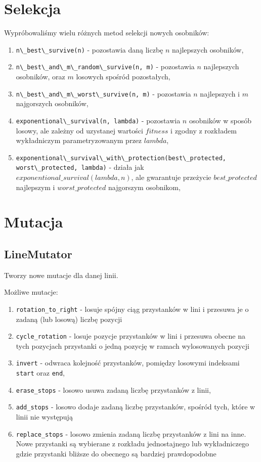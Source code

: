 \documentclass[12pt,a4paper,openright]{mwrep}
\begin{document}
\section{Selekcja}
Wypróbowaliśmy wielu różnych metod selekcji nowych osobników:
\begin{enumerate}
    \item \lstinline{n\_best\_survive(n)} - pozostawia daną liczbę $n$ najlepszych osobników,
    \item \lstinline{n\_best\_and\_m\_random\_survive(n, m)} - pozostawia $n$ najlepszych osobników, oraz $m$ losowych spośród pozostałych,
    \item \lstinline{n\_best\_and\_m\_worst\_survive(n, m)} - pozostawia $n$ najlepszych i $m$ najgorszych osobników,
    \item \lstinline{exponentional\_survival(n, lambda)} - pozostawia $n$ osobników w sposób losowy, ale zależny od uzystanej wartości $fitness$ i zgodny z rozkładem wykładniczym parametryzowanym przez $lambda$,
    \item \lstinline{exponentional\_survival\_with\_protection(best\_protected, worst\_protected, lambda)} - działa jak $exponentional\_survival(lambda, n)$, ale gwarantuje przeżycie $best\_protected$ najlepszym i $worst\_protected$ najgorszym osobnikom,
\end{enumerate}

\section{Mutacja}

\subsection{LineMutator}
Tworzy nowe mutacje dla danej linii.

Możliwe mutacje:

\begin{enumerate}
    \item \lstinline{rotation_to_right} - losuje spójny ciąg przystanków w lini i przesuwa je o zadaną (lub losową) liczbę pozycji
    \item \lstinline{cycle_rotation} - losuje pozycje przystanków w lini i przesuwa obecne na tych pozycjach przystanki o jedną pozycję w ramach wylosowanych pozycji
    \item \lstinline{invert} - odwraca kolejność przystanków, pomiędzy losowymi indeksami \lstinline{start} oraz \lstinline{end},
    \item \lstinline{erase_stops} - losowo usuwa zadaną liczbę przystanków z linii,
    \item \lstinline{add_stops} - losowo dodaje zadaną liczbę przystanków, spośród tych, które w linii nie występują
    \item \lstinline{replace_stops} - losowo zmienia zadaną liczbę przystanków z lini na inne. Nowe przystanki są wybierane z rozkładu jednostajnego lub wykładniczego gdzie przystanki bliższe do obecnego są bardziej prawdopodobne
\end{enumerate}
\end{document}

